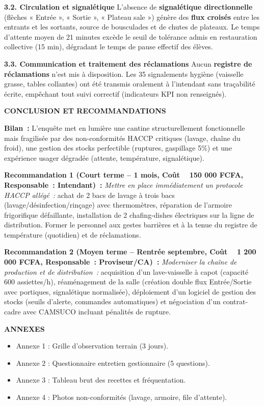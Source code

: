 \documentclass[11pt]{article}
\begin{document}
\begin{exoresolu}
\noindent \textbf{3.2. Circulation et signalétique}
L'absence de \textbf{signalétique directionnelle} (flèches « Entrée », « Sortie », « Plateau sale ») génère des \textbf{flux croisés} entre les entrants et les sortants, source de bousculades et de chutes de plateaux. Le temps d'attente moyen de 21 minutes excède le seuil de tolérance admis en restauration collective (15 min), dégradant le temps de pause effectif des élèves.

\noindent \textbf{3.3. Communication et traitement des réclamations}
Aucun \textbf{registre de réclamations} n'est mis à disposition. Les 35 signalements hygiène (vaisselle grasse, tables collantes) ont été transmis oralement à l'intendant sans traçabilité écrite, empêchant tout suivi correctif (indicateurs KPI non renseignés).

\noindent \textbf{CONCLUSION ET RECOMMANDATIONS}

\noindent \textbf{Bilan~:} L'enquête met en lumière une cantine structurellement fonctionnelle mais fragilisée par des non-conformités HACCP critiques (lavage, chaîne du froid), une gestion des stocks perfectible (ruptures, gaspillage 5\%) et une expérience usager dégradée (attente, température, signalétique).

\noindent \textbf{Recommandation 1 (Court terme – 1 mois, Coût ~ 150 000 FCFA, Responsable~: Intendant)~:}
\textit{Mettre en place immédiatement un protocole HACCP allégé~:} achat de 2 bacs de lavage à trois bacs (lavage/désinfection/rinçage) avec thermomètres, réparation de l'armoire frigorifique défaillante, installation de 2 chafing-dishes électriques sur la ligne de distribution. Former le personnel aux gestes barrières et à la tenue du registre de température (quotidien) et de réclamations.

\noindent \textbf{Recommandation 2 (Moyen terme – Rentrée septembre, Coût ~ 1 200 000 FCFA, Responsable~: Proviseur/CA)~:}
\textit{Moderniser la chaîne de production et de distribution~:} acquisition d'un lave-vaisselle à capot (capacité 600 assiettes/h), réaménagement de la salle (création double flux Entrée/Sortie avec portiques, signalétique normalisée), déploiement d'un logiciel de gestion des stocks (seuils d'alerte, commandes automatiques) et négociation d'un contrat-cadre avec CAMSUCO incluant pénalités de rupture.

\noindent \textbf{ANNEXES}
\begin{itemize}
    \item Annexe 1 : Grille d'observation terrain (3 jours).
    \item Annexe 2 : Questionnaire entretien gestionnaire (5 questions).
    \item Annexe 3 : Tableau brut des recettes et fréquentation.
    \item Annexe 4 : Photos non-conformités (lavage, armoire, file d'attente).
\end{itemize}


\end{exoresolu}
\end{document}
